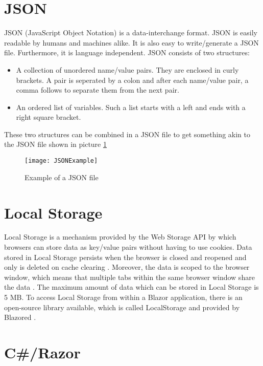 \section{JSON}
JSON (JavaScript Object Notation) \cite{json_url} is a data-interchange format. JSON is easily readable by humans and machines alike. It is also easy to write/generate a JSON file. Furthermore, it is language independent.\newline
JSON consists of two structures:
\begin{itemize}
	\item A collection of unordered name/value pairs. They are enclosed in curly brackets. A pair is seperated by a colon and after each name/value pair, a comma follows to separate them from the next pair.
	\item An ordered list of variables. Such a list starts with a left and ends with a right square bracket.
\end{itemize}
These two structures can be combined in a JSON file to get something akin to the JSON file shown in picture \ref{figure4}

\begin{figure}[H]
	\centering
	\texttt{[image: JSONExample]}
	\caption{Example of a JSON file}
	\label{figure4}
\end{figure}

\section{Local Storage} \label{Local Storage}
Local Storage is a mechanism provided by the Web Storage API by which browsers can store data as key/value pairs without having to use cookies. Data stored in Local Storage persists when the browser is closed and reopened and only is deleted on cache clearing \cite{web-storage-api-url}. Moreover, the data is scoped to the browser window, which means that multiple tabs within the same browser window share the data \cite{blazor-state-management-url}. The maximum amount of data which can be stored in Local Storage is 5 MB. To access Local Storage from within a Blazor application, there is an open-source library available, which is called LocalStorage and provided by Blazored \cite{local-storage-url}.

\section{C#/Razor}
